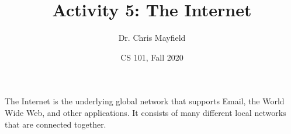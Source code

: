 \documentclass[12pt]{article}
\title{Activity 5: The Internet}
\author{Dr. Chris Mayfield}
\date{CS 101, Fall 2020}
\begin{document}
\maketitle

The Internet is the underlying global network that supports Email, the World Wide Web, and other applications. It consists of many different local networks that are connected together.


\newpage

\end{document}
